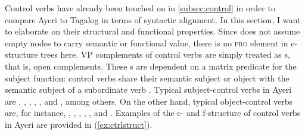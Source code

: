 Control verbs have already been touched on in \autoref{subsec:control} in order
to compare Ayeri to Tagalog in terms of syntactic alignment. In
this section, I want to elaborate on their structural and functional properties.
Since \Lfg{} does not assume empty nodes to
carry semantic or functional value, there is no \textsc{pro} element in
c-structure trees here. VP complements of control verbs are simply treated as
\XCompl{}s, that is, open
complements. These
\XCompl{}s are dependent on a matrix
predicate for the subject function:
control verbs share their semantic subject
or object with the semantic
subject of a subordinate verb
\citep[289\psqq]{bresnan2016}.%
Typical subject-control verbs in Ayeri are
,
,
,%
,
, and
,%
among others. On the other hand, typical object-control verbs are, for instance,
,
,
,
,
, and
. Examples of the c- and f-structure of control
verbs in Ayeri are provided in (\ref{ex:ctrlstruct}).

